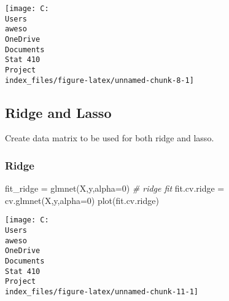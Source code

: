\documentclass[
]{article}
\newenvironment{Shaded}{\begin{snugshade}}{\end{snugshade}}
\newcommand{\AttributeTok}[1]{\textcolor[rgb]{0.77,0.63,0.00}{#1}}
\newcommand{\CommentTok}[1]{\textcolor[rgb]{0.56,0.35,0.01}{\textit{#1}}}
\newcommand{\DecValTok}[1]{\textcolor[rgb]{0.00,0.00,0.81}{#1}}
\newcommand{\FunctionTok}[1]{\textcolor[rgb]{0.00,0.00,0.00}{#1}}
\newcommand{\NormalTok}[1]{#1}
\newcommand{\OtherTok}[1]{\textcolor[rgb]{0.56,0.35,0.01}{#1}}
\newcommand{\SpecialCharTok}[1]{\textcolor[rgb]{0.00,0.00,0.00}{#1}}
\begin{document}
\texttt{[image: C:\\Users\\aweso\\OneDrive\\Documents\\Stat 410\\Project\\index\_files/figure-latex/unnamed-chunk-8-1]}

\hypertarget{ridge-and-lasso}{%
\subsection{Ridge and Lasso}\label{ridge-and-lasso}}

Create data matrix to be used for both ridge and lasso.

\begin{Shaded}
\end{Shaded}

\hypertarget{ridge}{%
\subsubsection{Ridge}\label{ridge}}

\begin{Shaded}
\begin{Highlighting}[]
\NormalTok{fit\_ridge }\OtherTok{=} \FunctionTok{glmnet}\NormalTok{(X,y,}\AttributeTok{alpha=}\DecValTok{0}\NormalTok{) }\CommentTok{\# ridge fit}
\NormalTok{fit.cv.ridge }\OtherTok{=} \FunctionTok{cv.glmnet}\NormalTok{(X,y,}\AttributeTok{alpha=}\DecValTok{0}\NormalTok{)}
\FunctionTok{plot}\NormalTok{(fit.cv.ridge)}
\end{Highlighting}
\end{Shaded}

\texttt{[image: C:\\Users\\aweso\\OneDrive\\Documents\\Stat 410\\Project\\index\_files/figure-latex/unnamed-chunk-11-1]}
\end{document}

